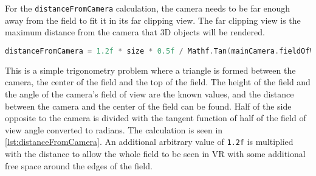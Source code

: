 For the \texttt{distanceFromCamera} calculation, the camera needs to be far enough away from the field to fit it in its far clipping view.
The far clipping view is the maximum distance from the camera that 3D objects will be rendered.
\begin{lstlisting}[caption={Calculation of the distance between the camera and field}, captionpos=b,language=C,label={lst:distanceFromCamera}]
    distanceFromCamera = 1.2f * size * 0.5f / Mathf.Tan(mainCamera.fieldOfView * 0.5f * Mathf.Deg2Rad);
\end{lstlisting}
This is a simple trigonometry problem where a triangle is formed between the camera, the center of the field and the top of the field.
The height of the field and the angle of the camera's field of view are the known values, and the distance between the camera and the center of the field can be found.
Half of the side opposite to the camera is divided with the tangent function of half of the field of view angle converted to radians.
The calculation is seen in \autoref{lst:distanceFromCamera}.
An additional arbitrary value of \texttt{1.2f} is multiplied with the distance to allow the whole field to be seen in VR with some additional free space around the edges of the field.
